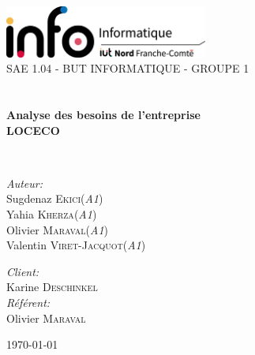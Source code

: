 \begin{titlepage}
\begin{center}

\includegraphics[width=0.5\textwidth]{./images/InfoLogoQuadriH.png}~\\[1cm]

\textsc{\LARGE SAE 1.04 - BUT INFORMATIQUE - GROUPE 1}\\[1.5cm]

\textsc{\Large }\\[0.5cm]

\HRule \\[0.4cm]

{\huge \bfseries Analyse des besoins de l'entreprise\\
 LOCECO\\[0.4cm] }

\HRule \\[1.5cm]

\begin{minipage}{0.4\textwidth}
\begin{flushleft} \large
\emph{Auteur:}\\
Sugdenaz \textsc{Ekici}(\textit{A1})\\
Yahia \textsc{Kherza}(\textit{A1})\\
Olivier \textsc{Maraval}(\textit{A1})\\
Valentin \textsc{Viret-Jacquot}(\textit{A1})
\end{flushleft}
\end{minipage}
\begin{minipage}{0.4\textwidth}
\begin{flushright} \large
\emph{Client:} \\
Karine \textsc{Deschinkel}\\
\emph{Référent:} \\
Olivier \textsc{Maraval}
\end{flushright}
\end{minipage}

\vfill

{\large \today}

\end{center}
\end{titlepage}
